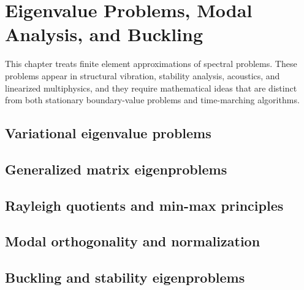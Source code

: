 \chapter{Eigenvalue Problems, Modal Analysis, and Buckling}
\label{ch:eigenproblems}

This chapter treats finite element approximations of spectral problems. These
problems appear in structural vibration, stability analysis, acoustics, and
linearized multiphysics, and they require mathematical ideas that are distinct
from both stationary boundary-value problems and time-marching algorithms.

\section{Variational eigenvalue problems}
\label{sec:eigenproblems:variational}


\section{Generalized matrix eigenproblems}
\label{sec:eigenproblems:matrix}


\section{Rayleigh quotients and min-max principles}
\label{sec:eigenproblems:rayleigh}


\section{Modal orthogonality and normalization}
\label{sec:eigenproblems:orthogonality}


\section{Buckling and stability eigenproblems}
\label{sec:eigenproblems:buckling}

